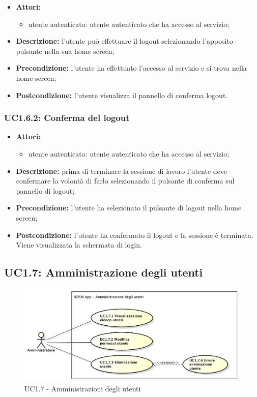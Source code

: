 \begin{itemize}
	\item \textbf{Attori:}
	\begin{itemize}
		\item utente autenticato: utente autenticato che ha accesso al servizio;
	\end{itemize}
	\item \textbf{Descrizione:} l'utente può effettuare il logout selezionando l'apposito pulsante nella sua home screen;
	\item \textbf{Precondizione:} l'utente ha effettuato l'accesso al servizio e si trova nella home screen;
	\item \textbf{Postcondizione:} l'utente visualizza il pannello di conferma logout.
\end{itemize}

\subsubsection{UC1.6.2: Conferma del logout}

\begin{itemize}
	\item \textbf{Attori:}
	\begin{itemize}
		\item utente autenticato: utente autenticato che ha accesso al servizio;
	\end{itemize}
	\item \textbf{Descrizione:} prima di terminare la sessione di lavoro l'utente deve confermare la volontà di farlo selezionando il pulsante di conferma sul pannello di logout;
	\item \textbf{Precondizione:} l'utente ha selezionato il pulsante di logout nella home screen;
	\item \textbf{Postcondizione:} l'utente ha confermato il logout e la sessione è terminata. Viene visualizzata la schermata di login.
\end{itemize}

\pagebreak


\subsection{UC1.7: Amministrazione degli utenti}

\begin{figure}[!htbp]
	\centering
	\centerline{\includegraphics[scale=0.45]{./images/UC1_7.pdf}}
	\caption{UC1.7 - Amministrazioni degli utenti}
\end{figure}


